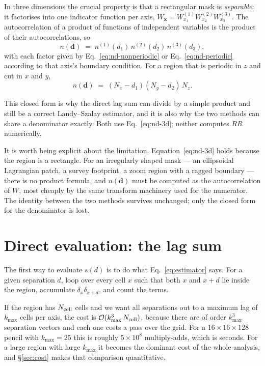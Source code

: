 \documentclass[12pt]{article}
\newcommand{\bx}{\mathbf{x}}
\newcommand{\bd}{\mathbf{d}}
\newcommand{\W}{W}
\begin{document}
In three dimensions the crucial property is that a rectangular mask is
\emph{separable}: it factorises into one indicator function per axis,
$\W_{\bx} = \W^{(1)}_{x_1}\W^{(2)}_{x_2}\W^{(3)}_{x_3}$.  The
autocorrelation of a product of functions of independent variables is the
product of their autocorrelations, so
\begin{equation}\label{eq:nd-3d}
  n(\bd) \;=\; n^{(1)}(d_1)\, n^{(2)}(d_2)\, n^{(3)}(d_3),
\end{equation}
with each factor given by Eq.~\eqref{eq:nd-nonperiodic} or
Eq.~\eqref{eq:nd-periodic} according to that axis's boundary condition.  For a
region that is periodic in $z$ and cut in $x$ and $y$,
\begin{equation}\label{eq:nd-pencil}
  n(\bd) \;=\; (N_x - d_1)(N_y - d_2)\,N_z .
\end{equation}

This closed form is why the direct lag sum can divide by a simple product and
still be a correct Landy--Szalay estimator, and it is also why the two
methods can share a denominator exactly.  Both use Eq.~\eqref{eq:nd-3d};
neither computes $RR$ numerically.

It is worth being explicit about the limitation.  Equation~\eqref{eq:nd-3d}
holds because the region is a rectangle.  For an irregularly shaped mask ---
an ellipsoidal Lagrangian patch, a survey footprint, a zoom region with a
ragged boundary --- there is no product formula, and $n(\bd)$ must be
computed as the autocorrelation of $\W$, most cheaply by the same
transform machinery used for the numerator.  The identity between the two
methods survives unchanged; only the closed form for the denominator is lost.

\section{Direct evaluation: the lag sum}\label{sec:direct}

The first way to evaluate $s(d)$ is to do what Eq.~\eqref{eq:estimator}
says.  For a given separation $d$, loop over every cell $x$ such that both $x$
and $x+d$ lie inside the region, accumulate $\delta_x\delta_{x+d}$, and count
the terms.

If the region has $N_{\rm cell}$ cells and we want all separations out to a
maximum lag of $k_{\max}$ cells per axis, the cost is
$\mathcal{O}(k_{\max}^3\, N_{\rm cell})$, because there are of order
$k_{\max}^3$ separation vectors and each one costs a pass over the grid.  For
a $16\times16\times128$ pencil with $k_{\max}=25$ this is roughly
$5\times10^{8}$ multiply-adds, which is seconds.  For a large region with
large $k_{\max}$ it becomes the dominant cost of the whole analysis, and
\S\ref{sec:cost} makes that comparison quantitative.
\end{document}
